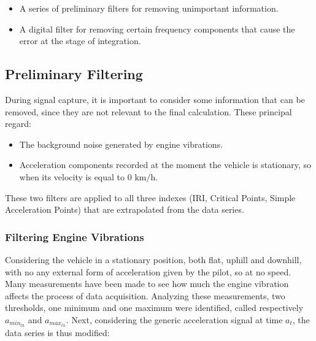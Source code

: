 \documentclass[tesi]{subfiles}
\begin{document}
\begin{itemize}
\item A series of preliminary filters for removing unimportant information.
\item A digital filter for removing certain frequency components that cause the error at the stage of integration.
\end{itemize}



\subsection{Preliminary Filtering}\label{ssc:Preliminary Filtering}
During signal capture, it is important to consider some information that can be removed, since they are not relevant to the final calculation. These principal regard:
\begin{itemize}
\item The background noise generated by engine vibrations.
\item Acceleration components recorded at the moment the vehicle is stationary, so when its velocity is equal to $0$ $\si{\km\per\hour}$.
\end{itemize}

\noindent These two filters are applied to all three indexes (IRI, Critical Points, Simple Acceleration Points) that are extrapolated from the data series.

\subsubsection{Filtering Engine Vibrations} \label{sssc:Remove Engine Vibrations Filter}
Considering the vehicle in a stationary position, both flat, uphill and downhill, with no any external form of acceleration given by the pilot, so at no speed. Many measurements have been made to see how much the engine vibration affects the process of data acquisition.
Analyzing these measurements, two thresholds, one minimum and one maximum were identified, called respectively \textbf{$a_{min_{th}}$} and \textbf{$a_{max_{th}}$}.
Next, considering the generic acceleration signal at time $a_{t}$, the data series is thus modified:
\end{document}
